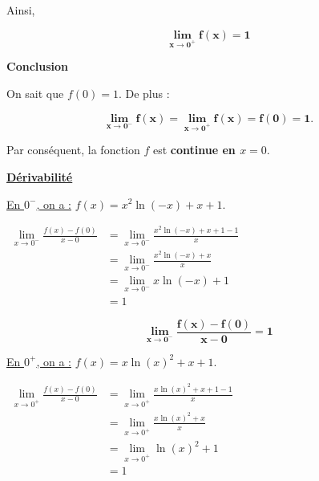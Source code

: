 \documentclass[12pt,a4paper]{article}
\begin{document}
\begin{enumerate}
          Ainsi,

          \begin{resultbox}
              \[
                  \mathbf{\lim\limits_{x \to 0^+} f(x) = 1}
              \]
          \end{resultbox}

          \textbf{  Conclusion }

          On sait que \( f(0) = 1 \). De plus :

          \begin{resultbox}
              \[
                  \mathbf{\lim\limits_{x \to 0^-} f(x) = \lim\limits_{x \to 0^+} f(x) = f(0) = 1.
                  }
              \]
          \end{resultbox}

          Par conséquent, la fonction \( f \) est \textbf{continue en \( x = 0 \)}.

          \underline{\textbf{Dérivabilité}}

          \underline{En \( 0^- \), on a :} \( f(x) = x^2 \ln(-x) + x + 1. \)

          \(
          \begin{aligned}
              \lim\limits_{x \to 0^-}\frac{f(x)-f(0)}{x-0} & =\lim\limits_{x \to 0^-} \frac{x^2 \ln(-x) + x + 1-1}{x} \\
                                                           & =\lim\limits_{x \to 0^-} \frac{x^2 \ln(-x) + x }{x}      \\
                                                           & =\lim\limits_{x \to 0^-} x \ln(-x) + 1                   \\
                                                           & =1
          \end{aligned}
          \)

          \begin{resultbox}
              \[
                  \mathbf{\lim\limits_{x \to 0^-}\frac{f(x)-f(0)}{x-0}=1
                  }
              \]
          \end{resultbox}

          \underline{En \( 0^+ \), on a :} \( f(x) = x \ln(x)^2 + x + 1. \)

          \(
          \begin{aligned}
              \lim\limits_{x \to 0^+}\frac{f(x)-f(0)}{x-0} & =\lim\limits_{x \to 0^+} \frac{x \ln(x)^2 + x + 1-1}{x} \\
                                                           & =\lim\limits_{x \to 0^+} \frac{x \ln(x)^2 + x }{x}      \\
                                                           & =\lim\limits_{x \to 0^+} \ln(x)^2+1                     \\
                                                           & =1
          \end{aligned}
          \)


\end{enumerate}
\end{document}
